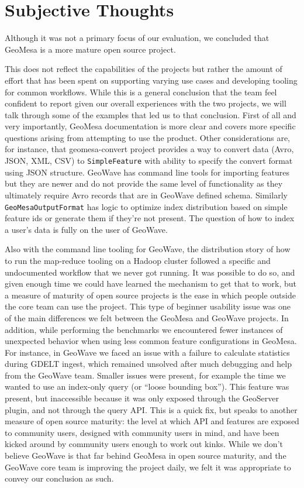 \section{Subjective Thoughts}
\label{sec:subjective}

Although it was not a primary focus of our evaluation, we concluded that GeoMesa is a more mature open source project.

This does not reflect the capabilities of the projects but rather the amount of effort that has been spent on supporting varying use cases and developing tooling for common workflows.
While this is a general conclusion that the team feel confident to report given our overall experiences with the two projects, we will talk through some of the examples that led us to that conclusion.
First of all and very importantly, GeoMesa documentation is more clear and covers more specific questions arising from attempting to use the product.
Other considerations are, for instance, that geomesa-convert project provides a way to convert data (Avro, JSON, XML, CSV) to \texttt{SimpleFeature} with ability to specify the convert format using JSON structure.
GeoWave has command line tools for importing features but they are newer and do not provide the same level of functionality as they ultimately require Avro records that are in GeoWave defined schema.
Similarly \texttt{GeoMesaOutputFormat} has logic to optimize index distribution based on simple feature ids or generate them if they're not present.
The question of how to index a user’s data is fully on the user of GeoWave.

Also with the command line tooling for GeoWave, the distribution story of how to run the map-reduce tooling on a Hadoop cluster followed a specific and undocumented workflow that we never got running.
It was possible to do so, and given enough time we could have learned the mechanism to get that to work, but a measure of maturity of open source projects is the ease in which people outside the core team can use the project.
This type of beginner usability issue was one of the main differences we felt between the GeoMesa and GeoWave projects.
In addition, while performing the benchmarks we encountered fewer instances of unexpected behavior when using less common feature configurations in GeoMesa.
For instance, in GeoWave we faced an issue with a failure to calculate statistics during GDELT ingest, which remained unsolved after much debugging and help from the GeoWave team.
Smaller issues were present, for example the time we wanted to use an index-only query (or ``loose bounding box'').
This feature was present, but inaccessible because it was only exposed through the GeoServer plugin, and not through the query API.
This is a quick fix, but speaks to another measure of open source maturity: the level at which API and features are exposed to community users, designed with community users in mind, and have been kicked around by community users enough to work out kinks.
While we don’t believe GeoWave is that far behind GeoMesa in open source maturity, and the GeoWave core team is improving the project daily, we felt it was appropriate to convey our conclusion as such.

